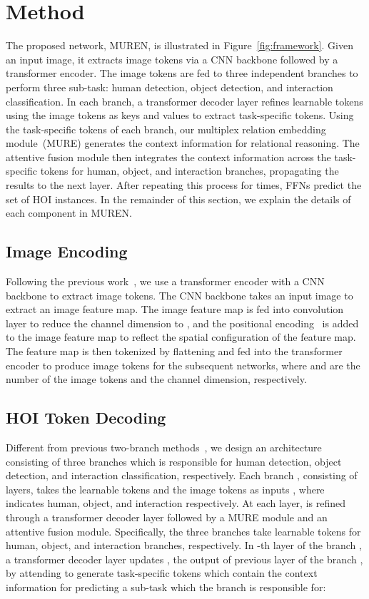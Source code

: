 \documentclass[10pt,twocolumn,letterpaper]{article}
\begin{document}
\section{Method}





The proposed network, MUREN, is illustrated in Figure~\ref{fig:framework}.
Given an input image, it extracts image tokens via a CNN backbone followed by a transformer encoder. 
The image tokens are fed to three independent branches to perform three sub-task: human detection, object detection, and interaction classification.
In each branch, a transformer decoder layer refines  learnable tokens using the image tokens as keys and values to extract task-specific tokens.
Using the task-specific tokens of each branch, our multiplex relation embedding module~(MURE) generates the context information for relational reasoning. The attentive fusion module then integrates the context information across the task-specific tokens for human, object, and interaction branches, propagating the results to the next layer.
After repeating this process for  times, FFNs predict the set of HOI instances.
In the remainder of this section, we explain the details of each component in MUREN.


\subsection{Image Encoding}
Following the previous work~\cite{detr,tamura2021qpic,zou2021end}, we use a transformer encoder with a CNN backbone to extract image tokens.
The CNN backbone takes an input image to extract an image feature map.
The image feature map is fed into  convolution layer to reduce the channel dimension to , and the positional encoding~\cite{detr} is added to the image feature map to reflect the spatial configuration of the feature map. 
The feature map is then tokenized by flattening and fed into  
the transformer encoder 
to produce image tokens  for the subsequent networks, where  and  are the number of the image tokens and the channel dimension, respectively.

\subsection{HOI Token Decoding}
Different from previous two-branch methods~\cite{kim2021hotr,zhou2022distr,chen2021asnet}, we design an architecture consisting of three branches which is responsible for human detection, object detection, and interaction classification, respectively.
Each branch , consisting of  layers, takes the learnable tokens  and the image tokens  as inputs , where  indicates human, object, and interaction respectively. At each layer,  is refined through a transformer decoder layer followed by a MURE module and an attentive fusion module. Specifically, the three branches take learnable tokens  for human, object, and interaction branches, respectively.
In -th layer of the branch , a transformer decoder layer  updates , the output of previous layer of the branch , by attending  to generate task-specific tokens  which contain the context information for predicting a sub-task which the branch  is responsible for:
\end{document}
